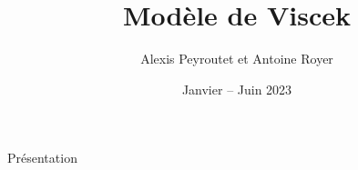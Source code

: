 \documentclass[french, a4paper, 12pt, openany]{book}
\title{\LARGE{\sc Modèle de Viscek}}
\author{\LARGE{Alexis Peyroutet et Antoine Royer}}
\date{\Large{Janvier – Juin 2023}}
\begin{document}
 \maketitle \tableofcontents
{}
	Présentation
\end{document}

